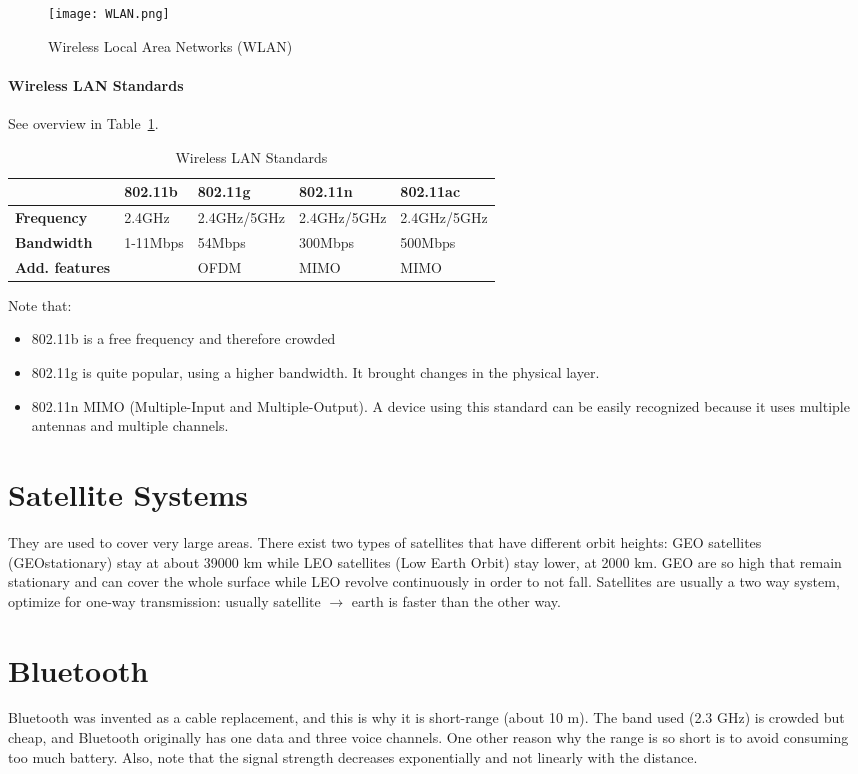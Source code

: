 \begin{figure}[t]
  \centering
  \texttt{[image: WLAN.png]}
  \caption{Wireless Local Area Networks (WLAN)}			
  
  \label{fig:cws:WLAN}
\end{figure}

\paragraph*{Wireless LAN Standards}
See overview in Table~\ref{tab:cws:WLANStd}.
\begin{table}[b]
\centering
\begin{tabular}{l|l|l|l|l|}
\cline{2-5}
 &\textbf{802.11b}     & \textbf{802.11g}     & \textbf{802.11n}     & \textbf{802.11ac}    \\ \hline
\textbf{Frequency}    &2.4GHz   & 2.4GHz/5GHz & 2.4GHz/5GHz & 2.4GHz/5GHz \\ \hline
\textbf{Bandwidth}    &1-11Mbps & 54Mbps      & 300Mbps     & 500Mbps     \\ \hline
\textbf{Add. features}&         & OFDM        & MIMO        & MIMO        \\ \hline
\end{tabular}
\caption{Wireless LAN Standards}
\label{tab:cws:WLANStd}
\end{table}


Note that:
\begin{itemize}
\item 802.11b is a free frequency and therefore crowded
\item 802.11g is quite popular, using a higher bandwidth. It 
  brought changes in the physical layer.
\item 802.11n MIMO (Multiple-Input and Multiple-Output). A 
  device using this standard can be easily recognized because it uses multiple 
  antennas and multiple channels.
\end{itemize}

\section{Satellite Systems}
They are used to cover very large areas. There exist two types of 
satellites that have different orbit heights: GEO satellites (GEOstationary) 
stay at about 39000 km while LEO satellites (Low Earth Orbit) stay lower, at 
2000 km. GEO are so high that remain stationary and can cover the whole surface 
while LEO revolve continuously in order to not fall.
Satellites are usually a two way system, optimize for one-way 
transmission: usually satellite $\to$ earth is faster than the other way.

\section{Bluetooth}
Bluetooth was invented as a cable replacement, and this is why it is 
short-range (about 10 m). The band used (2.3 GHz) is crowded but cheap, and 
Bluetooth originally has one data and three voice channels.
One other reason why the range is so short is to avoid consuming too much 
battery. Also, note that the signal strength decreases exponentially and not 
linearly with the distance.


